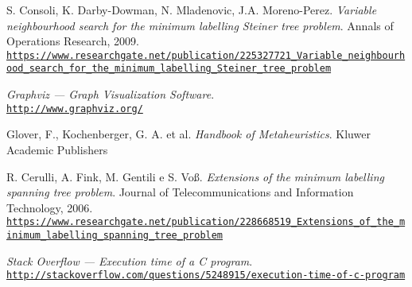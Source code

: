 \documentclass[12pt, a4paper]{article}
\begin{document}
\begin{thebibliography}{9}

S. Consoli, K. Darby-Dowman, N. Mladenovic, J.A. Moreno-Perez.
\textit{Variable neighbourhood search for the minimum labelling Steiner tree
problem}.
Annals of Operations Research, 2009.
\tiny
\\\texttt{\url{https://www.researchgate.net/publication/225327721_Variable_neighbourhood_search_for_the_minimum_labelling_Steiner_tree_problem}}
\normalsize

\textit{Graphviz --- Graph Visualization Software}. \\
\tiny
\texttt{\url{http://www.graphviz.org/}}
\normalsize

Glover, F., Kochenberger, G. A. et al.
\textit{Handbook of Metaheuristics}.
Kluwer Academic Publishers

R. Cerulli, A. Fink, M. Gentili e S. Voß.
\textit{Extensions of the minimum labelling spanning tree problem}.
Journal of Telecommunications and Information Technology, 2006.
\tiny
\\\texttt{\url{https://www.researchgate.net/publication/228668519_Extensions_of_the_minimum_labelling_spanning_tree_problem}}
\normalsize

\textit{Stack Overflow --- Execution time of a C program}. \\
\tiny
\texttt{\url{http://stackoverflow.com/questions/5248915/execution-time-of-c-program}}
\normalsize

\end{thebibliography}
\end{document}
